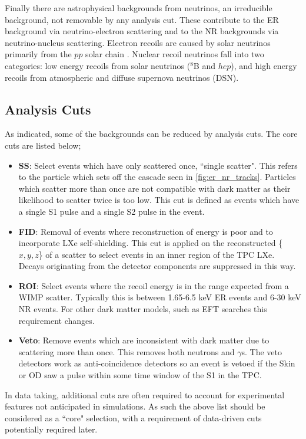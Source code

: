 \par
Finally there are astrophysical backgrounds from neutrinos, an irreducible background, not removable by any analysis cut.
These contribute to the ER background via neutrino-electron scattering and to the NR backgrounds via neutrino-nucleus scattering.
Electron recoils are caused by solar neutrinos primarily from the $pp$ solar chain \cite{solar_neutrinos_ref}.
Nuclear recoil neutrinos fall into two categories: low energy recoils from solar neutrinos ($^{8}$B and $hep$), and high energy recoils from atmospheric and diffuse supernova neutrinos (DSN).

\subsection{Analysis Cuts}
\label{sec:lz_analysis_cuts}
\par
As indicated, some of the backgrounds can be reduced by analysis cuts. 
The core cuts are listed below;
\begin{itemize}
    \item \textbf{SS}: Select events which have only scattered once, ``single scatter". This refers to the particle which sets off the cascade seen in \autoref{fig:er_nr_tracks}. Particles which scatter more than once are not compatible with dark matter as their likelihood to scatter twice is too low. This cut is defined as events which have a single S1 pulse and a single S2 pulse in the event.
    \item \textbf{FID}: Removal of events where reconstruction of energy is poor and to incorporate LXe self-shielding. This cut is applied on the reconstructed \{$x,y,z$\} of a scatter to select events in an inner region of the TPC LXe. Decays originating from the detector components are suppressed in this way.
    \item \textbf{ROI}: Select events where the recoil energy is in the range expected from a WIMP scatter. Typically this is between 1.65-6.5 keV ER events and 6-30 keV NR events. For other dark matter models, such as EFT searches this requirement changes.%
    \item \textbf{Veto}: Remove events which are inconsistent with dark matter due to scattering more than once. This removes both neutrons and $\gamma$s. The veto detectors work as anti-coincidence detectors so an event is vetoed if the Skin or OD saw a pulse within some time window of the S1 in the TPC.
\end{itemize}
In data taking, additional cuts are often required to account for experimental features not anticipated in simulations.
As such the above list should be considered as a ``core" selection, with a requirement of data-driven cuts potentially required later.

